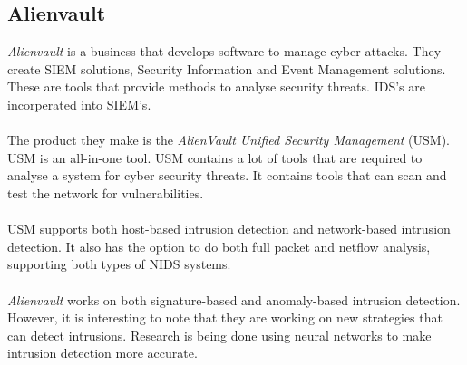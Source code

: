 \subsection{Alienvault}
\textit{Alienvault} is a business that develops software to manage cyber attacks. They create SIEM solutions, Security Information and Event Management solutions. These are tools that provide methods to analyse security threats. IDS's are incorperated into SIEM's. \cite{alienvault} \\
\\
The product they make is the \textit{AlienVault Unified Security Management} (USM). USM is an all-in-one tool. USM contains a lot of tools that are required to analyse a system for cyber security threats. It contains tools that can scan and test the network for vulnerabilities. \\
\\
USM supports both host-based intrusion detection and network-based intrusion detection. It also has the option to do both full packet and netflow analysis, supporting both types of NIDS systems. \cite{alienvaultProd} \\
\\
\textit{Alienvault} works on both signature-based and anomaly-based intrusion detection. However, it is interesting to note that they are working on new strategies that can detect intrusions. Research is being done using neural networks to make intrusion detection more accurate. \cite{alienvaultIDS}

